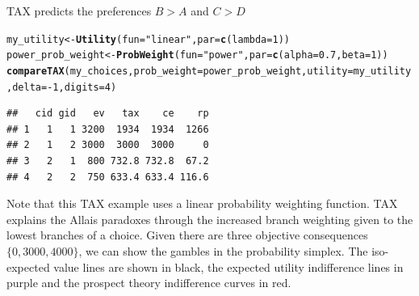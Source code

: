 \documentclass{article}\usepackage[]{graphicx}\usepackage[]{color}
\makeatletter
\newcommand{\hlnum}[1]{\textcolor[rgb]{0.686,0.059,0.569}{#1}}%
\newcommand{\hlstr}[1]{\textcolor[rgb]{0.192,0.494,0.8}{#1}}%
\newcommand{\hlopt}[1]{\textcolor[rgb]{0,0,0}{#1}}%
\newcommand{\hlstd}[1]{\textcolor[rgb]{0.345,0.345,0.345}{#1}}%
\newcommand{\hlkwb}[1]{\textcolor[rgb]{0.69,0.353,0.396}{#1}}%
\newcommand{\hlkwc}[1]{\textcolor[rgb]{0.333,0.667,0.333}{#1}}%
\newcommand{\hlkwd}[1]{\textcolor[rgb]{0.737,0.353,0.396}{\textbf{#1}}}%
\newenvironment{kframe}{%
 \def\at@end@of@kframe{}%
 \ifinner\ifhmode%
  \def\at@end@of@kframe{\end{minipage}}%
  \begin{minipage}{\columnwidth}%
 \fi\fi%
 \def\FrameCommand##1{\hskip\@totalleftmargin \hskip-\fboxsep
 \colorbox{shadecolor}{##1}\hskip-\fboxsep
     \hskip-\linewidth \hskip-\@totalleftmargin \hskip\columnwidth}%
 \MakeFramed {\advance\hsize-\width
   \@totalleftmargin\z@ \linewidth\hsize
   \@setminipage}}%
 {\par\unskip\endMakeFramed%
 \at@end@of@kframe}
\newenvironment{knitrout}{}{} %
\makeatother
\begin{document}
TAX predicts the preferences $B > A$ and $C > D$

\begin{knitrout}
\color{fgcolor}\begin{kframe}
\begin{alltt}
\hlstd{my_utility} \hlkwb{<-} \hlkwd{Utility}\hlstd{(}\hlkwc{fun}\hlstd{=}\hlstr{"linear"}\hlstd{,} \hlkwc{par}\hlstd{=}\hlkwd{c}\hlstd{(}\hlkwc{lambda}\hlstd{=}\hlnum{1}\hlstd{))}
\hlstd{power_prob_weight} \hlkwb{<-} \hlkwd{ProbWeight}\hlstd{(}\hlkwc{fun}\hlstd{=}\hlstr{"power"}\hlstd{,} \hlkwc{par}\hlstd{=}\hlkwd{c}\hlstd{(}\hlkwc{alpha}\hlstd{=}\hlnum{0.7}\hlstd{,} \hlkwc{beta}\hlstd{=}\hlnum{1}\hlstd{))}
\hlkwd{compareTAX}\hlstd{(my_choices,} \hlkwc{prob_weight}\hlstd{=power_prob_weight,} \hlkwc{utility}\hlstd{=my_utility,} \hlkwc{delta}\hlstd{=}\hlopt{-}\hlnum{1}\hlstd{,} \hlkwc{digits}\hlstd{=}\hlnum{4}\hlstd{)}
\end{alltt}
\begin{verbatim}
##   cid gid   ev   tax    ce    rp
## 1   1   1 3200  1934  1934  1266
## 2   1   2 3000  3000  3000     0
## 3   2   1  800 732.8 732.8  67.2
## 4   2   2  750 633.4 633.4 116.6
\end{verbatim}
\end{kframe}
\end{knitrout}


Note that this TAX example uses a linear probability weighting function. TAX explains the Allais paradoxes through the increased branch weighting given to the lowest branches of a choice.
Given there are three objective consequences $\{0, 3000, 4000\}$, we can show the gambles in the
probability simplex. The iso-expected value lines are shown in black, the expected utility indifference lines in purple and the prospect theory indifference curves in red.
\end{document}

